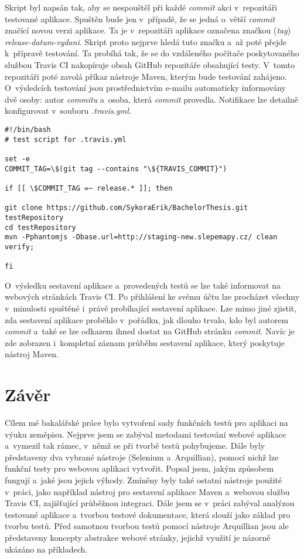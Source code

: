 \documentclass[
    color,   %
	table,   %
    twoside, %
    nolot, nolof,
]{fithesis3}
\begin{document}
Skript byl napsán tak, aby se nespouštěl při každé \emph{commit} akci v~repozitáři testované aplikace. Spuštěn bude jen v~případě, že se jedná o~větší \emph{commit} značící novou verzi aplikace. Ta je v~repozitáři aplikace označena značkou (\emph{tag}) \emph{release-datum-vydani}. Skript proto nejprve hledá tuto značku a~až poté přejde k~přípravě testování. Ta probíhá tak, že se do vzdáleného počítače poskytovaného službou Travis CI nakopíruje obsah GitHub repozitáře obsahující testy. V~tomto repozitáři poté zavolá příkaz nástroje Maven, kterým bude testování zahájeno. O~výsledcích testování jsou prostřednictvím e-mailu automaticky informovány dvě osoby: autor \emph{commitu} a~osoba, která  \emph{commit} provedla. Notifikace lze detailně konfigurovat v~souboru \emph{.travis.yml}.

\begin{lstlisting}
#!/bin/bash
# test script for .travis.yml
 
set -e
COMMIT_TAG=\$(git tag --contains "\${TRAVIS_COMMIT}")

if [[ \$COMMIT_TAG =~ release.* ]]; then 

git clone https://github.com/SykoraErik/BachelorThesis.git testRepository
cd testRepository
mvn -Pphantomjs -Dbase.url=http://staging-new.slepemapy.cz/ clean verify;

fi
\end{lstlisting} 

O~výsledku sestavení aplikace a~provedených testů se lze také informovat na webových stránkách Travis CI. Po přihlášení ke svému účtu lze procházet všechny v~minulosti spuštěné i~právě probíhající sestavení aplikace. Lze mimo jiné zjistit, zda sestavení aplikace proběhlo v~pořádku, jak dlouho trvalo, kdo byl autorem \emph{commit} a~také se lze odkazem ihned dostat na GitHub stránku \emph{commit}. Navíc je zde zobrazen i~kompletní záznam průběhu sestavení aplikace, který poskytuje nástroj Maven.

\chapter{Závěr}
\label{ch:chapter7}
Cílem mé bakalářské práce bylo vytvoření sady funkčních testů pro aplikaci na výuku zeměpisu. Nejprve jsem se zabýval metodami testování webové aplikace a~vymezil tak rámec, v~němž se při tvorbě testů pohybujeme. Dále byly představeny dva vybrané nástroje (Selenium a~Arquillian), pomocí nichž lze funkční testy pro webovou aplikaci vytvořit. Popsal jsem, jakým způsobem fungují a~jaké jsou jejich výhody. Zmíněny byly také ostatní nástroje použité v~práci, jako například nástroj pro sestavení aplikace Maven a~webovou službu Travis CI, zajišťující průběžnou integraci. Dále jsem se v~práci zabýval analýzou testované aplikace a~tvorbou testové dokumentace, která slouží jako základ pro tvorbu testů. Před samotnou tvorbou testů pomocí nástroje Arquillian jsou ale představeny koncepty abstrakce webové stránky, jejichž využití je názorně ukázáno na příkladech.
\end{document}

